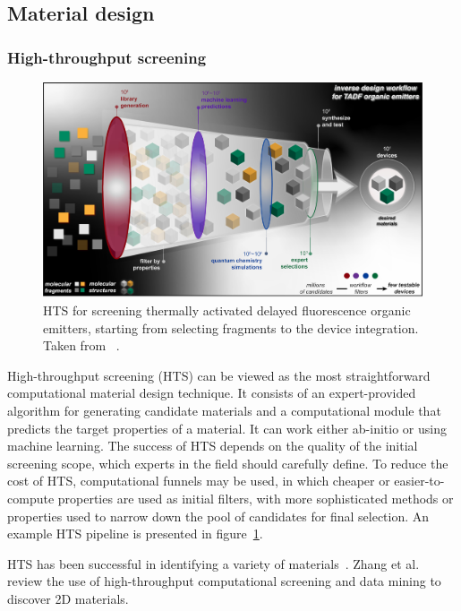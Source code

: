 \subsection{Material design}
\label{sec:inverse}
\subsubsection{High-throughput screening}
\label{subsec:High-throughput}
\begin{figure}[H]
	\noindent
	\centering
	\includegraphics[width=\textwidth]{figures/hts.jpeg}
	\caption{HTS for screening thermally activated delayed fluorescence organic emitters, starting from selecting fragments to the device integration. Taken from ~\cite{pollice2021data}.}
\label{fig:HTS}
\end{figure}

High-throughput screening (HTS) can be viewed as the most straightforward computational material design technique. It consists of an expert-provided algorithm for generating candidate materials and a computational module that predicts the target properties of a material. It can work either ab-initio or using machine learning. The success of HTS depends on the quality of the initial screening scope, which experts in the field should carefully define. To reduce the cost of HTS, computational funnels may be used, in which cheaper or easier-to-compute properties are used as initial filters, with more sophisticated methods or properties used to narrow down the pool of candidates for final selection. An example HTS pipeline is presented in figure~\ref{fig:HTS}.

HTS has been successful in identifying a variety of materials~\cite{song2021usability,li2018high,sarikurt2020high}. Zhang et al. \cite{zhangHighthroughputComputationalScreening2019} review the use of high-throughput computational screening and data mining to discover 2D materials.

